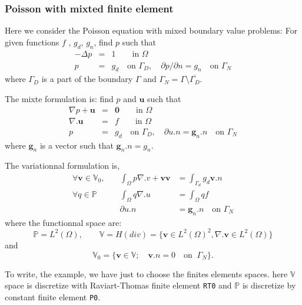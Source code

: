 \documentclass[a4paper,twoside,12pt]{book}
\def\p{\partial}
\begin{document}
\subsubsection{Poisson with mixted finite element}

Here we consider the   Poisson equation with mixed boundary value
problems:
For given functions $f$ , $g_d$, $g_n$, find $p$ such that
\begin{eqnarray}
\label{eqn:mixBoundary1}
-\Delta p &=& 1 \qquad \textrm{in }\Omega\nonumber\\
p&=&g_d\quad \textrm{on }\Gamma_D,\quad
\p p/\p n=g_n\quad \textrm{on }\Gamma_N
\end{eqnarray}
where $\Gamma_D$ is a part of the boundary $\Gamma$ and
$\Gamma_N=\Gamma\setminus \overline{\Gamma_D}$.

The mixte formulation is: find $p$ and $\mathbf{u}$ such that
\begin{eqnarray}
\label{eqn:fmixte1}
\nabla p +  \mathbf{u}  &=& \mathbf{0} \qquad \textrm{in }\Omega\nonumber\\
\nabla. \mathbf{u} &=& f \qquad \textrm{in }\Omega\nonumber\\
p&=&g_d\quad \textrm{on }\Gamma_D,\quad
\p u. n= \mathbf{g}_n.n \quad \textrm{on }\Gamma_N
\end{eqnarray}
where $\mathbf{g}_n$ is a vector such that $\mathbf{g}_n.n = g_n$.

The variationnal formulation is,
\begin{eqnarray}\label{eqn:fmixte2}
  \forall \mathbf{v} \in \mathbb{V}_0 ,  \quad  &\int_\Omega  p \nabla.v +  \mathbf{v} \mathbf{v}  &= \int_{\Gamma_d} g_d \mathbf{v}.n \nonumber\\
   \forall {q} \in  \mathbb{P}   \quad  &  \int_\Omega  q \nabla.u &= \int_\Omega  q f \nonumber\\
   & \p u. n &= \mathbf{g}_n.n \quad \textrm{on }\Gamma_N
\end{eqnarray}
where the functionnal space are:
$$\mathbb{P}= L^2(\Omega),\qquad \mathbb{V}= H(div)=\{ \mathbf{v} \in L^2(\Omega)^2, \nabla. \mathbf{v} \in  L^2(\Omega) \}$$
 and
$$\mathbb{V}_0 = \{  \mathbf{v}\in \mathbb{V} ; \quad  \mathbf{v}. n = 0 \quad \mathrm{on }\;\; \Gamma_N \}.$$

To write, the \freefempp example, we have just to choose the finites elements spaces.
here $\mathbb{V}$ space  is discretize  with Raviart-Thomas finite element  \texttt{RT0} and $\mathbb{P}$ is discretize by
constant  finite element \texttt{P0}.
\end{document}
